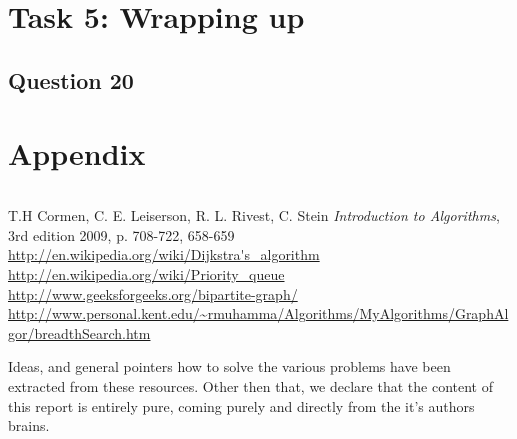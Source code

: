 \documentclass[a4paper]{article}
\begin{document}
\section{Task 5: Wrapping up}
\subsection*{Question 20}

\section{Appendix}

\begin{lstlisting}
\end{lstlisting}

\begin{thebibliography}{9}
		T.H Cormen, C. E. Leiserson, R. L. Rivest, C. Stein 	
				\textit{Introduction to Algorithms}, 3rd edition 2009, p. 708-722, 658-659 \\
		\url{http://en.wikipedia.org/wiki/Dijkstra's\_algorithm} \\
		\url{http://en.wikipedia.org/wiki/Priority\_queue} \\
		\url{http://www.geeksforgeeks.org/bipartite-graph/}
		\url{http://www.personal.kent.edu/~rmuhamma/Algorithms/MyAlgorithms/GraphAlgor/breadthSearch.htm}
\end{thebibliography}

Ideas, and general pointers how to solve the various problems have been extracted from these resources. Other then that, we declare that the content of this report is entirely pure, coming purely and directly from the it's authors brains.  
\end{document}
